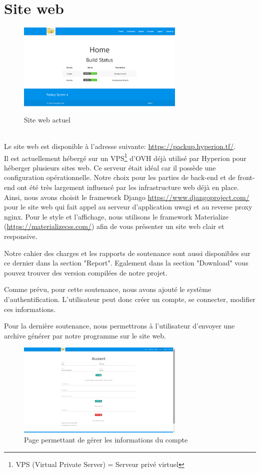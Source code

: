 \newpage

\section{Site web}
    \begin{figure}[!h]
		\centering
		\includegraphics[width=8cm]{images/website.png}
		\caption{Site web actuel}
		\label{Site web actuel}
	\end{figure}
	\\
    Le site web est disponible à l'adresse suivante: \url{https://packup.hyperion.tf/}. \\
    Il est actuellement hébergé sur un VPS\footnote{VPS (Virtual Private Server) = Serveur privé virtuel} d'OVH déjà utilisé par Hyperion pour héberger plusieurs sites web. Ce serveur était idéal car il possède une configuration opérationnelle. Notre choix pour les parties de back-end et de front-end ont été très largement influencé par les infrastructure web déjà en place. Ainsi, nous avons choisit le framework Django \url{https://www.djangoproject.com/} pour le site web qui fait appel au serveur d'application uwsgi et au reverse proxy nginx.
    Pour le style et l'affichage, nous utilisons le framework Materialize (\url{https://materializecss.com/}) afin de vous présenter un site web clair et responsive.

    Notre cahier des charges et les rapports de soutenance sont aussi disponibles sur ce dernier dans la section "Report". Egalement dans la section "Download" vous pouvez trouver des version compilées de notre projet.
    
    Comme prévu, pour cette soutenance, nous avons ajouté le système d'authentification.
    L'utilisateur peut donc créer un compte, se connecter, modifier ces informations.
    
    Pour la dernière soutenance, nous permettrons à l'utilisateur d'envoyer une archive générer par notre programme sur le site web.
    \begin{figure}[!h]
		\centering
		\includegraphics[width=8cm]{images/website-account.png}
		\caption{Page permettant de gérer les informations du compte}
		\label{Site web - Page permettant de gérer les informations du compte}
	\end{figure}
    
